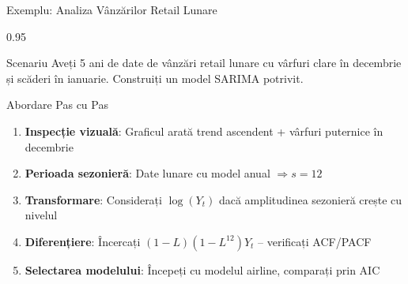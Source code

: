 \documentclass[9pt, aspectratio=169, t]{beamer}
\begin{document}
\begin{frame}{Exemplu: Analiza Vânzărilor Retail Lunare}
    \begin{cminipage}{0.95\textwidth}
    \begin{block}{Scenariu}
        Aveți 5 ani de date de vânzări retail lunare cu vârfuri clare în decembrie și scăderi în ianuarie. Construiți un model SARIMA potrivit.
    \end{block}

    \vspace{0.2cm}

    \begin{exampleblock}{Abordare Pas cu Pas}
        \begin{enumerate}\setlength{\itemsep}{0pt}
            \item \textbf{Inspecție vizuală}: Graficul arată trend ascendent + vârfuri puternice în decembrie
            \item \textbf{Perioada sezonieră}: Date lunare cu model anual $\Rightarrow s = 12$
            \item \textbf{Transformare}: Considerați $\log(Y_t)$ dacă amplitudinea sezonieră crește cu nivelul
            \item \textbf{Diferențiere}: Încercați $(1-L)(1-L^{12})Y_t$ -- verificați ACF/PACF
            \item \textbf{Selectarea modelului}: Începeți cu modelul airline, comparați prin AIC
        \end{enumerate}
    \end{exampleblock}
    \end{cminipage}
\end{frame}
\end{document}
